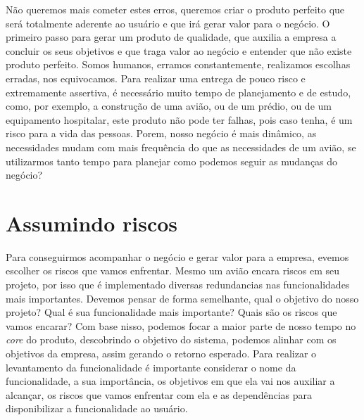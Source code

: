     Não queremos mais cometer estes erros, queremos criar o produto perfeito que
    será totalmente aderente ao usuário e que irá gerar valor para o negócio. \newline
    O primeiro passo para gerar um produto de qualidade, que auxilia a empresa a
    concluir os seus objetivos e que traga valor ao negócio e entender que não
    existe produto perfeito. Somos humanos, erramos constantemente, realizamos
    escolhas erradas, nos equivocamos. Para realizar uma entrega de pouco risco
    e extremamente assertiva, é necessário muito tempo de planejamento e de estudo,
    como, por exemplo, a construção de uma avião, ou de um prédio, ou de um
    equipamento hospitalar, este produto não pode ter falhas, pois caso
    tenha, é um risco para a vida das pessoas. Porem, nosso negócio é mais
    dinâmico, as necessidades mudam com mais frequência do que as necessidades de
    um avião, se utilizarmos tanto tempo para planejar como podemos seguir as
    mudanças do negócio?

    \section{Assumindo riscos}
      Para conseguirmos acompanhar o negócio e gerar valor para a empresa, evemos
      escolher os riscos que vamos enfrentar. Mesmo um avião encara riscos em seu
      projeto, por isso que é implementado diversas redundancias nas funcionalidades
      mais importantes. Devemos pensar de forma semelhante, qual o objetivo do nosso
      projeto? Qual é sua funcionalidade mais importante? Quais são os riscos que
      vamos encarar? \newline
      Com base nisso, podemos focar a maior parte de nosso tempo no \textit{core}
      do produto, descobrindo o objetivo do sistema, podemos alinhar com os objetivos
      da empresa, assim gerando o retorno esperado. Para realizar o levantamento
      da funcionalidade é importante considerar o nome da funcionalidade, a sua
      importância, os objetivos em que ela vai nos auxiliar a alcançar, os riscos
      que vamos enfrentar com ela e as dependências para disponibilizar a
      funcionalidade ao usuário.

